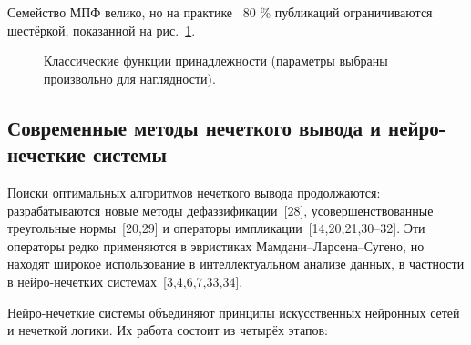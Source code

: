 Семейство МПФ велико, но на практике ~80 \% публикаций
ограничиваются шестёркой, показанной на рис.~\ref{fig:mpf}.
\begin{figure}[h]
\centering
{}
\caption{Классические функции принадлежности  
  (параметры выбраны произвольно для наглядности).}
\label{fig:mpf}
\end{figure}


\subsection{Современные методы нечеткого вывода и нейро-нечеткие системы}
\label{sec:advanced_inference}

Поиски оптимальных алгоритмов нечеткого вывода продолжаются: разрабатываются
новые методы дефаззификации~[28], усовершенствованные треугольные нормы~[20,29]
и операторы импликации~[14,20,21,30–32]. Эти операторы редко применяются в
эвристиках Мамдани–Ларсена–Сугено, но находят широкое использование в
интеллектуальном анализе данных, в частности в нейро-нечетких
системах~[3,4,6,7,33,34].

Нейро-нечеткие системы объединяют принципы искусственных нейронных сетей и
нечеткой логики. Их работа состоит из четырёх этапов:

